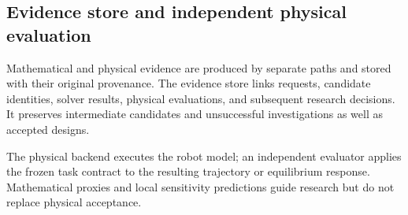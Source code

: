 \subsection{Evidence store and independent physical evaluation}

Mathematical and physical evidence are produced by separate paths and stored with their original provenance. The evidence store links requests, candidate identities, solver results, physical evaluations, and subsequent research decisions. It preserves intermediate candidates and unsuccessful investigations as well as accepted designs.

The physical backend executes the robot model; an independent evaluator applies the frozen task contract to the resulting trajectory or equilibrium response. Mathematical proxies and local sensitivity predictions guide research but do not replace physical acceptance.
